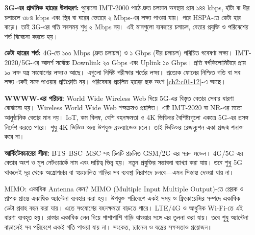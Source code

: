 \textbf{3G-এর প্রাথমিক হারের উদাহরণ:} পুরোনো IMT-2000 পাঠে দ্রুত চলমান অবস্থায় প্রায় ১৪৪ kbps, হাঁটা বা ধীর চলাচলে ৩৮৪ kbps এবং স্থির বা ঘরের ভেতরে ২ Mbps-এর লক্ষ্য পাওয়া যায়। পরে HSPA-তে ডেটা হার বাড়ে। তাই 3G-এর গতি সবসময় শুধু ২ Mbps নয়। এই মানগুলো ব্যবহারে চলাচল, বেতার প্রযুক্তি ও পরিবেশের শর্ত বিবেচনা করতে হয়।

\textbf{ডেটা হারের শর্ত:} 4G-তে ১০০ Mbps (দ্রুত চলাচল) ও ১ Gbps (ধীর চলাচল) পরিচিত গবেষণা লক্ষ্য। IMT-2020/5G-এর আদর্শ সর্বোচ্চ Downlink ২০ Gbps এবং Uplink ১০ Gbps। প্রতি বর্গকিলোমিটারে প্রায় ১০ লক্ষ যন্ত্র সংযোগের লক্ষ্যও আছে। এগুলো নির্দিষ্ট পরীক্ষার শর্তের লক্ষ্য। প্রত্যেক ফোনের নিশ্চিত গতি বা সব লক্ষ্য একই সঙ্গে পাওয়ার প্রতিশ্রুতি নয়। পরিষেবার প্রচলিত হারের ছক অংশ \ref{ch2:c01-12}-এ আছে।

\textbf{WWWW-এর পরিচয়:} World Wide Wireless Web দিয়ে 5G-এর বিস্তৃত বেতার সেবার ধারণা বোঝানো হয়। Wireless World Wide Web শব্দক্রমও প্রচলিত। এটি IMT-2020 বা NR-এর মতো আনুষ্ঠানিক বেতার মান নয়। IoT, কম বিলম্ব, বেশি বহনক্ষমতা ও 4K ভিডিওর বৈশিষ্ট্যগুলো একত্রে 5G-এর প্রসঙ্গ নির্দেশ করতে পারে। শুধু 4K ভিডিও অন্য উপযুক্ত ব্রডব্যান্ডেও চলে। তাই ভিডিওর রেজল্যুশন একা প্রজন্ম শনাক্ত করে না।

\textbf{আর্কিটেকচারের সীমা:} BTS–BSC–MSC-সহ চিত্রটি প্রচলিত GSM/2G-এর সরল মডেল। 4G/5G-এর বেতার অংশ ও মূল নেটওয়ার্কে নাম এবং দায়িত্ব ভিন্ন হয়। নতুন প্রযুক্তির সম্ভাবনা ব্যাখ্যা করা যায়। তবে শুধু 5G থাকলেই দূর থেকে অস্ত্রোপচার বা স্বয়ংচালিত গাড়ির সব ব্যবস্থা নিরাপদে চলবে—এমন সিদ্ধান্ত দেওয়া যায় না।

\begin{keypointbox}{MIMO: একাধিক Antenna কেন?}
MIMO (Multiple Input Multiple Output)-তে প্রেরক ও প্রাপক প্রান্তে একাধিক অ্যান্টেনা ব্যবহার করা হয়। উপযুক্ত পরিবেশে একই সময় ও ফ্রিকোয়েন্সির সম্পদে একাধিক ডেটা প্রবাহ বহন করা যায়। এতে সংযোগের বহনক্ষমতা বাড়তে পারে। LTE/4G ও আধুনিক Wi-Fi-তে এই ধারণা ব্যবহৃত হয়। রাস্তার একাধিক লেন দিয়ে পাশাপাশি গাড়ি যাওয়ার সঙ্গে এর তুলনা করা যায়। তবে শুধু অ্যান্টেনা বাড়ালেই সব পরিবেশে একই গতি পাওয়া যায় না। সংকেত, চ্যানেল ও যন্ত্রের সক্ষমতাও প্রয়োজন।
\end{keypointbox}


